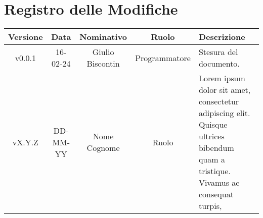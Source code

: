 \section*{\Large Registro delle Modifiche}
    \begin{table}[h]
        \centering
        \renewcommand\tabularxcolumn[1]{m{#1}} %
        \renewcommand{\arraystretch}{1.5}
        \begin{tabularx}{0.98\textwidth}
            {c|c|c|c|>{\centering\arraybackslash}X}
            \rowcolor{black}
            \textbf{\color{white} Versione} & \textbf{\color{white} Data} & \textbf{\color{white} Nominativo} & \textbf{\color{white} Ruolo} & \textbf{\color{white} Descrizione} \\ 
            \hline

            v0.0.1 & 16-02-24 & Giulio Biscontin & Programmatore & Stesura del documento. \\
            vX.Y.Z & DD-MM-YY & Nome Cognome & Ruolo & Lorem ipsum dolor sit amet, consectetur adipiscing elit. Quisque ultrices bibendum quam a tristique. Vivamus ac consequat turpis, \\
            \hline
        \end{tabularx}
    \end{table}